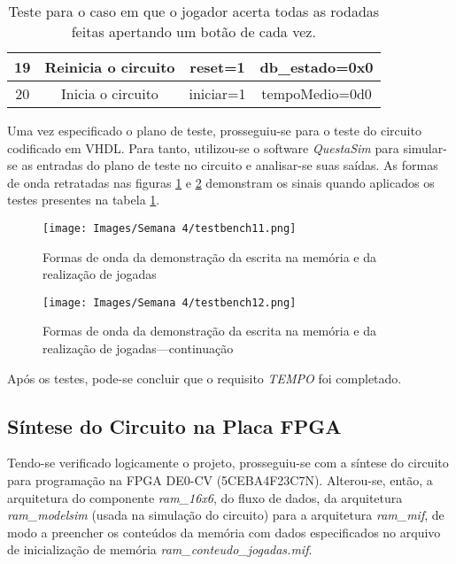 \documentclass[amsmath,amssymb,floatfix]{report}
\begin{document}
\begin{table}[H]
\begin{tabular}{|cccc|}
\multicolumn{1}{|c|}{19}          & \multicolumn{1}{c|}{Reinicia o circuito} & \multicolumn{1}{c|}{reset=1}                                                            & \multicolumn{1}{c|}{db\_estado=0x0}              \\ \hline
\multicolumn{1}{|c|}{20}          & \multicolumn{1}{c|}{Inicia o circuito}       & \multicolumn{1}{c|}{iniciar=1}                                                          & \multicolumn{1}{c|}{tempoMedio=0d0}                                                    \\ \hline
\end{tabular}
\caption{Teste para o caso em que o jogador acerta todas as rodadas feitas apertando um botão de cada vez.}
\label{tab:testbench41}
\end{table}

Uma vez especificado o plano de teste, prosseguiu-se para o teste do circuito codificado em VHDL. Para tanto, utilizou-se o software \textit{QuestaSim} para simular-se as entradas do plano de teste no circuito e analisar-se suas saídas. As formas de onda retratadas nas figuras \ref{fig:testbench41} e \ref{fig:testbench42} demonstram os sinais quando aplicados os testes presentes na tabela \ref{tab:testbench41}. 

\begin{figure}[H]
    \centering
    \texttt{[image: Images/Semana 4/testbench11.png]}
    \caption{Formas de onda da demonstração da escrita na memória e da realização de jogadas}
    \label{fig:testbench41}
\end{figure}

\begin{figure}[H]
    \centering
    \texttt{[image: Images/Semana 4/testbench12.png]}
    \caption{Formas de onda da demonstração da escrita na memória e da realização de jogadas---continuação}
    \label{fig:testbench42}
\end{figure}

Após os testes, pode-se concluir que o requisito \textit{TEMPO} foi completado.

\subsection{Síntese do Circuito na Placa FPGA}
\label{subsec:sintese4}

Tendo-se verificado logicamente o projeto, prosseguiu-se com a síntese do circuito para programação na FPGA DE0-CV (5CEBA4F23C7N). Alterou-se, então, a arquitetura do componente \textit{ram\_16x6}, do fluxo de dados, da arquitetura \textit{ram\_modelsim} (usada na simulação do circuito) para a arquitetura \textit{ram\_mif}, de modo a preencher os conteúdos da memória com dados especificados no arquivo de inicialização de memória \textit{ram\_conteudo\_jogadas.mif}.
\end{document}
